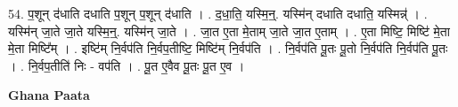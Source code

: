 \documentclass[17pt]{extarticle}
\begin{document}
54. प॒शून् द॑धाति दधाति प॒शून् प॒शून् द॑धाति । . द॒धा॒ति॒ यस्मि॒न्॒. यस्मि॑न् दधाति दधाति॒ यस्मिन्न्॑ । . यस्मि॑न् जा॒ते जा॒ते यस्मि॒न्॒. यस्मि॑न् जा॒ते । . जा॒त ए॒ता मे॒ताम् जा॒ते जा॒त ए॒ताम् । . ए॒ता मिष्टि॒ मिष्टि॑ मे॒ता मे॒ता मिष्टि᳚म् । . इष्टि॑म् नि॒र्वप॑ति नि॒र्वप॒तीष्टि॒ मिष्टि॑म् नि॒र्वप॑ति । . नि॒र्वप॑ति पू॒तः पू॒तो नि॒र्वप॑ति नि॒र्वप॑ति पू॒तः । . नि॒र्वप॒तीति॑ निः - वप॑ति । . पू॒त ए॒वैव पू॒तः पू॒त ए॒व । \newline

\textbf{Ghana Paata } \newline
\end{document}
